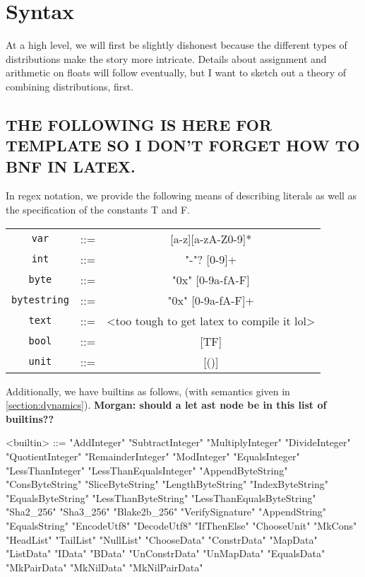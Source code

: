 \documentclass[../main.tex]{subfiles}
\begin{document}
\section{Syntax}\label{section:syntax}

At a high level, we will first be slightly dishonest because the different types of distributions make the story more intricate. Details about assignment and arithmetic on floats will follow eventually, but I want to sketch out a theory of combining distributions, first.





\subsection{THE FOLLOWING IS HERE FOR TEMPLATE SO I DON'T FORGET HOW TO BNF IN LATEX. }
In regex notation, we provide the following means of describing literals as well as the specification of the constants T and F.
    \begin{center}
    \begin{tabular}{c c c}
        \texttt{var} & ::= & [a-z][a-zA-Z0-9]* \\
        \texttt{int} & ::= & "-"? [0-9]+ \\
        \texttt{byte} & ::= & "0x" [0-9a-fA-F] \\
        \texttt{bytestring} & ::= & "0x" [0-9a-fA-F]+ \\
        \texttt{text} & ::= & <too tough to get latex to compile it lol>  \\
        \texttt{bool} & ::= & [TF] \\
        \texttt{unit} & ::= & [()]
    \end{tabular}
    \end{center}
    \label{tab:atomsregex}

Additionally, we have builtins as follows, (with semantics given in \ref{section:dynamics}). \textbf{Morgan: should a let ast node be in this list of builtins??}
\begin{grammar}
    <builtin> ::=
        "AddInteger" \alt "SubtractInteger" \alt "MultiplyInteger"
        \alt "DivideInteger" \alt "QuotientInteger" \alt "RemainderInteger"
        \alt "ModInteger" \alt "EqualsInteger" \alt "LessThanInteger"
        \alt "LessThanEqualsInteger" \alt "AppendByteString"
        \alt "ConsByteString" \alt "SliceByteString" \alt "LengthByteString"
        \alt "IndexByteString" \alt "EqualsByteString" \alt "LessThanByteString"
        \alt "LessThanEqualsByteString" \alt "Sha2_256" \alt "Sha3_256" \alt "Blake2b_256"
        \alt "VerifySignature" \alt "AppendString" \alt "EqualsString"
        \alt "EncodeUtf8" \alt "DecodeUtf8" \alt "IfThenElse" \alt "ChooseUnit"
        \alt "MkCons" \alt "HeadList" \alt "TailList" \alt "NullList"
        \alt "ChooseData" \alt "ConstrData" \alt "MapData" \alt "ListData"
        \alt "IData" \alt "BData" \alt "UnConstrData" \alt "UnMapData"
        \alt "EqualsData" \alt "MkPairData" \alt "MkNilData" \alt "MkNilPairData"
\end{grammar}
\end{document}
